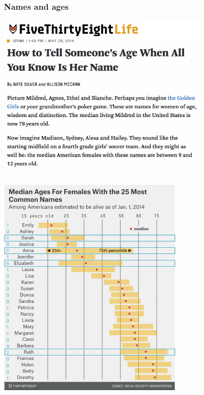 \documentclass[11pt,containsverbatim,handout,xcolor=xelatex,dvipsnames,table]{beamer}
\begin{document}

\begin{frame}
\frametitle{Names and ages}

\begin{center}
\includegraphics[width=0.8\textwidth]{figures/nameage538}
\end{center}


\end{frame}



\begin{frame}
\frametitle{}

\vspace{-0.45cm}

\begin{center}
\includegraphics[width=0.7\textwidth]{figures/popnamesclass538_female}
\end{center}

\end{frame}
\end{document}

